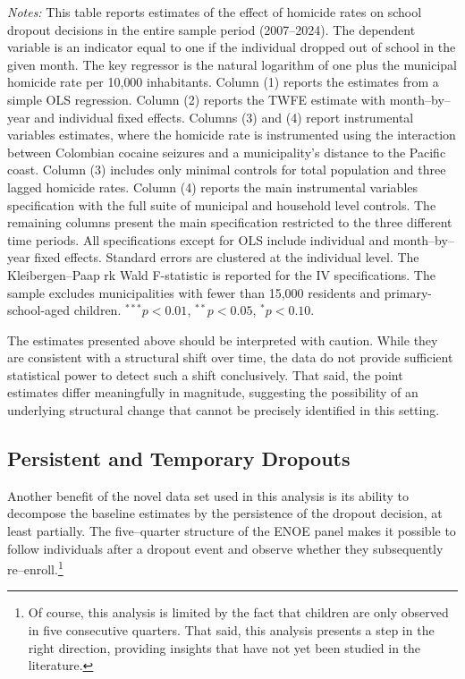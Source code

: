 \documentclass[12pt,letter,english,intoc,bibliography=totoc,index=totoc,BCOR10mm,captions=tableheading,nottitlepage,fleqn]{article}
\theoremstyle{break}
\begin{document}
\begin{table}[H]
\caption{Baseline Estimates}
\label{tab:baseline_specs}
\centering
\scriptsize

\vspace{2mm}
\begin{minipage}{0.95\linewidth}
\scriptsize \singlespacing
\textit{Notes:} This table reports estimates of the effect of homicide rates on school dropout decisions in the entire sample period (2007--2024). The dependent variable is an indicator equal to one if the individual dropped out of school in the given month. The key regressor is the natural logarithm of one plus the municipal homicide rate per 10{,}000 inhabitants. Column (1) reports the estimates from a simple OLS regression. Column (2) reports the TWFE estimate with month--by--year and individual fixed effects. Columns (3) and (4) report instrumental variables estimates, where the homicide rate is instrumented using the interaction between Colombian cocaine seizures and a municipality's distance to the Pacific coast. Column (3) includes only minimal controls for total population and three lagged homicide rates. Column (4) reports the main instrumental variables specification with the full suite of municipal and household level controls. The remaining columns present the main specification restricted to the three different time periods. All specifications except for OLS include individual and month--by--year fixed effects. Standard errors are clustered at the individual level. The Kleibergen--Paap rk Wald F-statistic is reported for the IV specifications. The sample excludes municipalities with fewer than 15{,}000 residents and primary-school-aged children. $^{***}p<0.01$, $^{**}p<0.05$, $^{*}p<0.10$.
\end{minipage}
\end{table}
The estimates presented above should be interpreted with caution. While they are consistent with a structural shift over time, the data do not provide sufficient statistical power to detect such a shift conclusively. That said, the point estimates differ meaningfully in magnitude, suggesting the possibility of an underlying structural change that cannot be precisely identified in this setting.

\subsection*{Persistent and Temporary Dropouts}
Another benefit of the novel data set used in this analysis is its ability to decompose the baseline estimates by the persistence of the dropout decision, at least partially. The five--quarter structure of the ENOE panel makes it possible to follow individuals after a dropout event and observe whether they subsequently re--enroll.\footnote{Of course, this analysis is limited by the fact that children are only observed in five consecutive quarters. That said, this analysis presents a step in the right direction, providing insights that have not yet been studied in the literature.}
\end{document}
